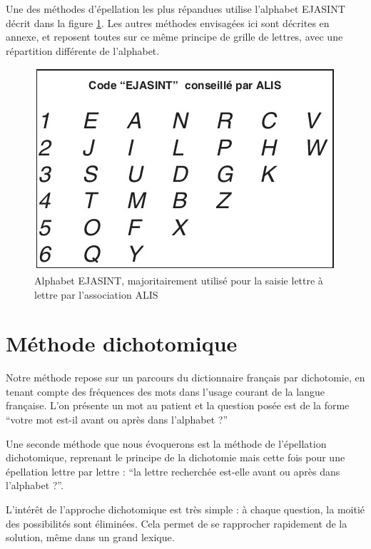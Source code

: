 \documentclass[twoside,twocolumn]{article}
\begin{document}
Une des méthodes d'épellation les plus répandues utilise l'alphabet EJASINT décrit dans la figure \ref{ejasint}. Les autres méthodes envisagées ici sont décrites en annexe, et reposent toutes sur ce même principe de grille de lettres, avec une répartition différente de l'alphabet.
\begin{center}
\begin{figure}
  \includegraphics[scale=0.45]{ejasint.jpg}
  \caption{Alphabet EJASINT, majoritairement utilisé pour la saisie lettre à lettre par l'association ALIS}
  \label{ejasint}
\end{figure}
\end{center}


\section{Méthode dichotomique}

Notre méthode repose sur un parcours du dictionnaire français par dichotomie, en tenant compte des fréquences des mots dans l'usage courant de la langue française. L'on présente un mot au patient et la question posée est de la forme ``votre mot est-il avant ou après dans l'alphabet ?''

Une seconde méthode que nous évoquerons est la méthode de l'épellation dichotomique, reprenant le principe de la dichotomie mais cette fois pour une épellation lettre par lettre : ``la lettre recherchée est-elle avant ou après dans l'alphabet ?''.

L'intérêt de l'approche dichotomique est très simple : à chaque question, la moitié des possibilités sont éliminées. Cela permet de se rapprocher rapidement de la solution, même dans un grand lexique.
\end{document}
